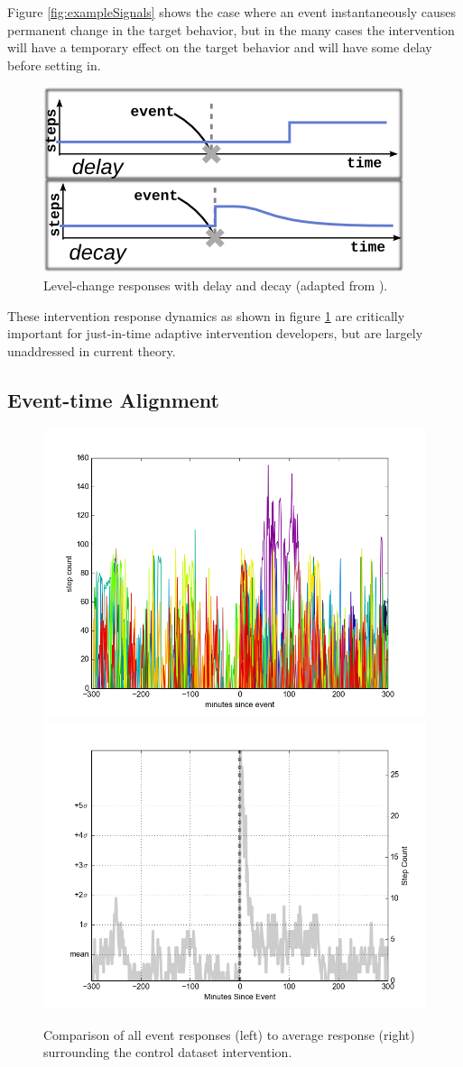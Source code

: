 \documentclass[review,journal]{vgtc}         %
\begin{document}
Figure \ref{fig:exampleSignals} shows the case where an event instantaneously causes permanent change in the target behavior, but in the many cases the intervention will have a temporary effect on the target behavior and will have some delay before setting in.

\begin{figure}
\centering
\includegraphics[width=0.6\columnwidth]{./img/exampleDynamicComplications.png}
\caption{Level-change responses with delay and decay (adapted from \cite{glass1975}).}
\label{fig:exampleComplications}
\end{figure}

These intervention response dynamics as shown in figure \ref{fig:exampleComplications} are critically important for just-in-time adaptive intervention developers, but are largely unaddressed in current theory.

\subsection{Event-time Alignment}

\begin{figure}
\centering
\includegraphics[width=0.45\columnwidth]{./img/perfect_intervention_individual_events.png}
\includegraphics[width=0.45\columnwidth]{./img/perfect_intervention.png}
\caption{Comparison of all event responses (left) to average response (right) surrounding the control dataset intervention.}
\label{fig:interventionAverage}
\end{figure}
\end{document}
